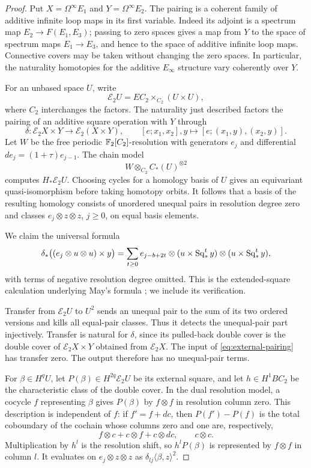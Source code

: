 \begin{proof}
Put $X=\Omega^\infty E_1$ and $Y=\Omega^\infty E_2$.
The pairing is a coherent family of additive infinite loop maps in its
first variable.  Indeed its adjoint is a spectrum map
$E_2\to F(E_1,E_3)$; passing to zero spaces gives a map from $Y$ to the
space of spectrum maps $E_1\to E_3$, and hence to the space of additive
infinite loop maps.  Connective covers may be taken without changing
the zero spaces.  In particular, the naturality homotopies for the
additive $E_\infty$ structure vary coherently over $Y$.

For an unbased space $U$, write
\[
 \mathcal E_2U=EC_2\times_{C_2}(U\times U),
\]
where $C_2$ interchanges the factors.  The naturality just described
factors the pairing of an additive square operation with $Y$ through
\[
 \delta:\mathcal E_2X\times Y\longrightarrow\mathcal E_2(X\times Y),
 \qquad [e;x_1,x_2],y\longmapsto[e;(x_1,y),(x_2,y)].
\]
Let $W$ be the free periodic $\mathbb F_2[C_2]$-resolution with generators
$e_j$ and differential $d e_j=(1+\tau)e_{j-1}$.
The chain model
\[
 W\otimes_{C_2}C_*(U)^{\otimes2}
\]
computes $H_*\mathcal E_2U$.  Choosing cycles for a homology basis of
$U$ gives an equivariant quasi-isomorphism before taking homotopy
orbits.  It follows that a basis of the resulting homology consists of
unordered unequal pairs in resolution degree zero and classes
$e_j\otimes z\otimes z$, $j\geq0$, on equal basis elements.

We claim the universal formula
\begin{equation}
\label{eq:external-pairing}
 \delta_*\bigl((e_j\otimes u\otimes u)\times y\bigr)
 =\sum_{t\geq0}e_{j-b+2t}\otimes
       (u\times\operatorname{Sq}_*^t y)\otimes(u\times\operatorname{Sq}_*^t y),
\end{equation}
with terms of negative resolution degree omitted.  This is the
extended-square calculation underlying May's formula
\cite[\S2, formula~(2.11), pp.~246--247]{Madsen1975}; we include its verification.

Transfer from $\mathcal E_2U$ to $U^2$ sends an unequal pair to the sum
of its two ordered versions and kills all equal-pair classes.  Thus it
detects the unequal-pair part injectively.  Transfer is natural for
$\delta$, since its pulled-back double cover is the double cover of
$\mathcal E_2X\times Y$ obtained from $\mathcal E_2X$.
The input of \eqref{eq:external-pairing} has transfer zero.  The output
therefore has no unequal-pair terms.

For $\beta\in H^qU$, let $P(\beta)\in H^{2q}\mathcal E_2U$ be its
external square, and let $h\in H^1BC_2$ be the characteristic class of
the double cover.  In the dual resolution model, a cocycle $f$
representing $\beta$ gives $P(\beta)$ by $f\otimes f$ in resolution
column zero.  This description is independent of $f$: if
$f'=f+dc$, then $P(f')-P(f)$ is the total coboundary of the cochain
whose columns zero and one are, respectively,
\[
 f\otimes c+c\otimes f+c\otimes dc,
 \qquad c\otimes c.
\]
Multiplication by $h^l$ is the resolution shift, so
$h^lP(\beta)$ is represented by $f\otimes f$ in column $l$.
It evaluates on $e_j\otimes z\otimes z$ as
$\delta_{lj}\langle\beta,z\rangle^2$.


\end{proof}
